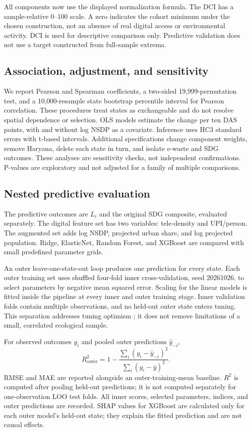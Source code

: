 \documentclass[11pt,a4paper]{article}
\begin{document}
All components now use the displayed normalization formula. The DCI has a sample-relative 0--100 scale. A zero indicates the cohort minimum under the chosen construction, not an absence of real digital access or environmental activity. DCI is used for descriptive comparison only. Predictive validation does not use a target constructed from full-sample extrema.

\subsection{Association, adjustment, and sensitivity}
We report Pearson and Spearman coefficients, a two-sided 19,999-permutation test, and a 10,000-resample state bootstrap percentile interval for Pearson correlation. These procedures treat states as exchangeable and do not resolve spatial dependence or selection. OLS models estimate the change per ten DAS points, with and without log NSDP as a covariate. Inference uses HC3 standard errors with t-based intervals. Additional specifications change component weights, remove Haryana, delete each state in turn, and isolate e-waste and SDG outcomes. These analyses are sensitivity checks, not independent confirmations. P-values are exploratory and not adjusted for a family of multiple comparisons.

\subsection{Nested predictive evaluation}
The predictive outcomes are $L_i$ and the original SDG composite, evaluated separately. The digital feature set has two variables: tele-density and UPI/person. The augmented set adds log NSDP, projected urban share, and log projected population. Ridge, ElasticNet, Random Forest, and XGBoost \cite{xgboost} are compared with small predefined parameter grids.

An outer leave-one-state-out loop produces one prediction for every state. Each outer training set uses shuffled four-fold inner cross-validation, seed 20261026, to select parameters by negative mean squared error. Scaling for the linear models is fitted inside the pipeline at every inner and outer training stage. Inner validation folds contain multiple observations, and no held-out outer state enters tuning. This separation addresses tuning optimism \cite{varma}; it does not remove limitations of a small, correlated ecological sample.

For observed outcomes $y_i$ and pooled outer predictions $\hat y_{-i}$,
\begin{equation}
R^2_{\mathrm{outer}}=1-\frac{\sum_i(y_i-\hat y_{-i})^2}{\sum_i(y_i-\bar y)^2}.
\end{equation}
RMSE and MAE are reported alongside an outer-training-mean baseline. $R^2$ is computed after pooling held-out predictions; it is not computed separately for one-observation LOO test folds. All inner scores, selected parameters, indices, and outer predictions are recorded. SHAP values \cite{shap} for XGBoost are calculated only for each outer model's held-out state; they explain the fitted prediction and are not causal effects.
\end{document}
